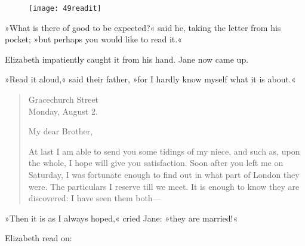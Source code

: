 \begin{figure}[tbh]
\centering
\texttt{[image: 49readit]}
\end{figure}

»What is there of good to be expected?« said he, taking the letter from his pocket; »but perhaps you would like to read it.«

Elizabeth impatiently caught it from his hand. Jane now came up.

»Read it aloud,« said their father, »for I hardly know myself what it is about.«

\begin{quotation}
	
\begin{flushright}
Gracechurch Street\\ Monday, August 2.
\end{flushright}

\noindent My dear Brother,

At last I am able to send you some tidings of my niece, and such as, upon the whole, I hope will give you satisfaction. Soon after you left me on Saturday, I was fortunate enough to find out in what part of London they were. The particulars I reserve till we meet. It is enough to know they are discovered: I have seen them both—
\end{quotation}

»Then it is as I always hoped,« cried Jane: »they are married!«

Elizabeth read on: 

